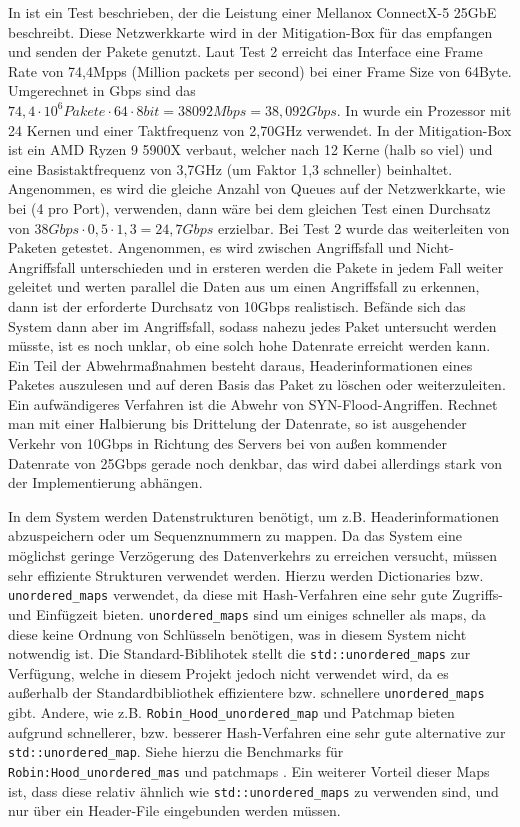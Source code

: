 \documentclass[../review_1.tex]{subfiles}
\begin{document}
In \cite{mellanox_nic_benchmark} ist ein Test beschrieben, der die Leistung einer Mellanox ConnectX-5 25GbE beschreibt. Diese Netzwerkkarte wird in der Mitigation-Box für das empfangen und senden der Pakete genutzt. Laut Test 2 erreicht das Interface eine Frame Rate von 74,4Mpps (Million packets per second) bei einer Frame Size von 64Byte. Umgerechnet in Gbps sind das \(74,4 \cdot 10^6 Pakete \cdot 64 \cdot 8 bit = 38092Mbps = 38,092Gbps\). In \cite{mellanox_nic_benchmark} wurde ein Prozessor mit 24 Kernen und einer Taktfrequenz von 2,70GHz verwendet. In der Mitigation-Box ist ein AMD Ryzen 9 5900X verbaut, welcher nach \cite{ryzen_benchmarks} 12 Kerne (halb so viel) und eine Basistaktfrequenz von 3,7GHz (um Faktor 1,3 schneller) beinhaltet. Angenommen, es wird die gleiche Anzahl von Queues auf der Netzwerkkarte, wie bei \cite{mellanox_nic_benchmark} (4 pro Port), verwenden, dann wäre bei dem gleichen Test einen Durchsatz von \(38Gbps \cdot 0,5 \cdot 1,3 = 24,7Gbps\) erzielbar. Bei Test 2 wurde das weiterleiten von Paketen getestet. Angenommen, es wird zwischen Angriffsfall und Nicht-Angriffsfall unterschieden und in ersteren werden die Pakete in jedem Fall weiter geleitet und werten parallel die Daten aus um einen Angriffsfall zu erkennen, dann ist der erforderte Durchsatz von 10Gbps realistisch. Befände sich das System dann aber im Angriffsfall, sodass nahezu jedes Paket untersucht werden müsste, ist es noch unklar, ob eine solch hohe Datenrate erreicht werden kann. Ein Teil der Abwehrmaßnahmen besteht daraus, Headerinformationen eines Paketes auszulesen und auf deren Basis das Paket zu löschen oder weiterzuleiten. Ein aufwändigeres Verfahren ist die Abwehr von SYN-Flood-Angriffen. Rechnet man mit einer Halbierung bis Drittelung der Datenrate, so ist ausgehender Verkehr von 10Gbps in Richtung des Servers bei von außen kommender Datenrate von 25Gbps gerade noch denkbar, das wird dabei allerdings stark von der Implementierung abhängen.

In dem System werden Datenstrukturen benötigt, um z.B. Headerinformationen abzuspeichern oder um Sequenznummern zu mappen. Da das System eine möglichst geringe Verzögerung des Datenverkehrs zu erreichen versucht, müssen sehr effiziente Strukturen verwendet werden. Hierzu werden Dictionaries bzw. \texttt{unordered\_maps} verwendet, da diese mit Hash-Verfahren eine sehr gute Zugriffs- und Einfügzeit bieten. \texttt{unordered\_maps} sind um einiges schneller als maps, da diese keine Ordnung von Schlüsseln benötigen, was in diesem System nicht notwendig ist.
Die Standard-Biblihotek stellt die \texttt{std::unordered\_maps} zur Verfügung, welche in diesem Projekt jedoch nicht verwendet wird, da es außerhalb der Standardbibliothek effizientere bzw. schnellere \texttt{unordered\_maps} gibt. Andere, wie z.B. \texttt{Robin\_Hood\_unordered\_map} und Patchmap bieten aufgrund schnellerer, bzw. besserer Hash-Verfahren eine sehr gute alternative zur \texttt{std::unordered\_map}. Siehe hierzu die Benchmarks für \texttt{Robin:Hood\_unordered\_mas} \cite{RobinHoodMap} und patchmaps \cite{Patchmap}. Ein weiterer Vorteil dieser Maps ist, dass diese relativ ähnlich wie \texttt{std::unordered\_maps} zu verwenden sind, und nur über ein Header-File eingebunden werden müssen.
\end{document}
